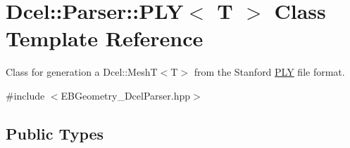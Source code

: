 \hypertarget{classDcel_1_1Parser_1_1PLY}{}\section{Dcel\+:\+:Parser\+:\+:P\+LY$<$ T $>$ Class Template Reference}
\label{classDcel_1_1Parser_1_1PLY}


Class for generation a Dcel\+::\+Mesh\+T$<$\+T$>$ from the Stanford \hyperlink{classDcel_1_1Parser_1_1PLY}{P\+LY} file format.  




{\ttfamily \#include $<$E\+B\+Geometry\+\_\+\+Dcel\+Parser.\+hpp$>$}

\subsection*{Public Types}
